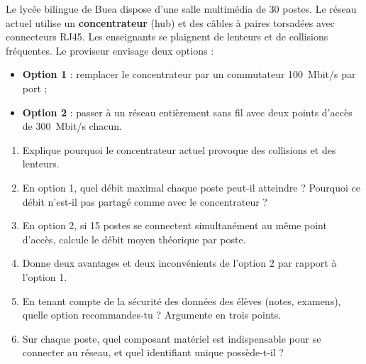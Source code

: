 \documentclass[11pt]{article}
\begin{document}
\begin{exercice}
Le lycée bilingue de Buea dispose d'une salle multimédia de 30 postes. Le réseau actuel utilise un \textbf{concentrateur} (hub) et des câbles à paires torsadées avec connecteurs RJ45. Les enseignants se plaignent de lenteurs et de collisions fréquentes. Le proviseur envisage deux options :
\begin{itemize}
  \item \textbf{Option 1} : remplacer le concentrateur par un commutateur \SI{100}{Mbit/s} par port ;
  \item \textbf{Option 2} : passer à un réseau entièrement sans fil avec deux points d'accès de \SI{300}{Mbit/s} chacun.
\end{itemize}
\begin{enumerate}
  \item Explique pourquoi le concentrateur actuel provoque des collisions et des lenteurs.
  \item En option 1, quel débit maximal chaque poste peut-il atteindre ? Pourquoi ce débit n'est-il pas partagé comme avec le concentrateur ?
  \item En option 2, si 15 postes se connectent simultanément au même point d'accès, calcule le débit moyen théorique par poste.
  \item Donne deux avantages et deux inconvénients de l'option 2 par rapport à l'option 1.
  \item En tenant compte de la sécurité des données des élèves (notes, examens), quelle option recommandes-tu ? Argumente en trois points.
  \item Sur chaque poste, quel composant matériel est indispensable pour se connecter au réseau, et quel identifiant unique possède-t-il ?
\end{enumerate}
\end{exercice}
\end{document}
